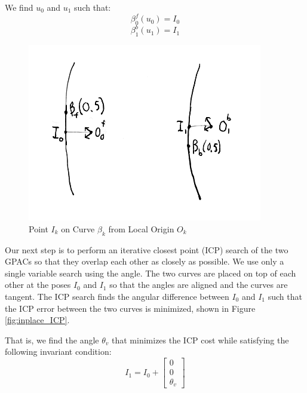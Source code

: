 We find $u_0$ and $u_1$ such that:
\begin{equation}
\beta_0^f(u_0) = I_0
\end{equation}
\begin{equation}
\beta_1^b(u_1) = I_1
\end{equation}

\begin{figure}
  \begin{center}
    \includegraphics[scale=0.8]{5_local_origin.png}
  \end{center}
  \caption{Point $I_k$ on Curve $\beta_k$ from Local Origin $O_k$}
	\label{fig:local_origin}
\end{figure}

Our next step is to perform an iterative closest point (ICP) search of the two GPACs so that they overlap each other as closely as possible.  We use only a single variable search using the angle.  The two curves are placed on top of each other at the poses $I_0$ and $I_1$ so that the angles are aligned and the curves are tangent.  The ICP search finds the angular difference between $I_0$ and $I_1$ such that the ICP error between the two curves is minimized, shown in Figure \ref{fig:inplace_ICP}.

That is, we find the angle $\theta_v$ that minimizes the ICP cost while satisfying the following invariant condition:
\begin{equation}
I_1 = I_0 +
\begin{bmatrix}
0 \\
0 \\
\theta_v
\end{bmatrix}
\end{equation}

